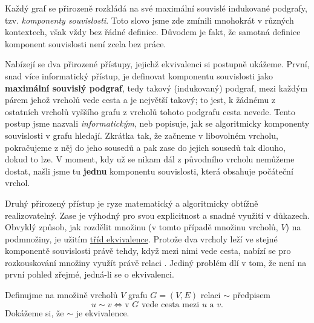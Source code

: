 Každý graf se přirozeně rozkládá na své maximální souvislé indukované podgrafy,
tzv. \emph{komponenty souvislosti}. Toto slovo jsme zde zmínili mnohokrát v
různých kontextech, však vždy bez řádné definice. Důvodem je fakt, že samotná
definice komponent souvislosti není zcela bez práce.

Nabízejí se dva přirozené přístupy, jejichž ekvivalenci si postupně ukážeme.
První, snad více informatický přístup, je definovat komponentu souvislosti jako
\textbf{maximální souvislý podgraf}, tedy takový (indukovaný) podgraf, mezi
každým párem jehož vrcholů vede cesta a je největší takový; to jest, k žádnému z
ostatních vrcholů vyššího grafu z vrcholů tohoto podgrafu cesta nevede. Tento
postup jsme nazvali \emph{informatickým}, neb popisuje, jak se algoritmicky
komponenty souvislosti v grafu hledají. Zkrátka tak, že začneme v libovolném
vrcholu, pokračujeme z něj do jeho sousedů a pak zase do jejich sousedů tak
dlouho, dokud to lze. V moment, kdy už se nikam dál z původního vrcholu nemůžeme
dostat, našli jsme tu \textbf{jednu} komponentu souvislosti, která obsahuje
počáteční vrchol.

Druhý přirozený přístup je ryze matematický a algoritmicky obtížně
realizovatelný. Zase je výhodný pro svou explicitnost a snadné využití v
důkazech. Obvyklý způsob, jak rozdělit množinu (v tomto případě množinu vrcholů,
$V$) na podmnožiny, je užitím \hyperref[def:trida-ekvivalence]{tříd
ekvivalence}. Protože dva vrcholy leží ve stejné komponentě souvislosti právě
tehdy, když mezi nimi vede cesta, nabízí se pro rozkouskování množiny využít
právě relaci . Jediný problém dlí v tom, že není na
první pohled zřejmé, jedná-li se o ekvivalenci.

Definujme na množině vrcholů $V$ grafu $G = (V,E)$ relaci $ \sim $ předpisem
\[
 u \sim v \Leftrightarrow \text{v $G$ vede cesta mezi $u$ a $v$}.
\]
Dokážeme si, že $ \sim $ je ekvivalence.

